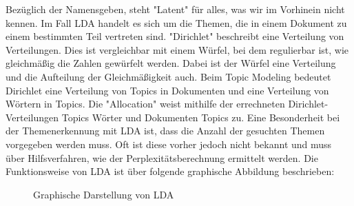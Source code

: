 \documentclass[german,version-2020-11]{uzl-thesis}
\begin{document}
Bezüglich der Namensgeben, steht "Latent" für alles, was wir im Vorhinein nicht kennen. Im Fall LDA handelt es sich um die Themen, die in einem Dokument zu einem bestimmten Teil vertreten sind. "Dirichlet" beschreibt eine Verteilung von Verteilungen. Dies ist vergleichbar mit einem Würfel, bei dem regulierbar ist, wie gleichmäßig die Zahlen gewürfelt werden. Dabei ist der Würfel eine Verteilung und die Aufteilung der Gleichmäßigkeit auch. Beim Topic Modeling bedeutet Dirichlet eine Verteilung von Topics in Dokumenten und eine Verteilung von Wörtern in Topics. Die "Allocation" weist  mithilfe der errechneten Dirichlet-Verteilungen Topics Wörter und Dokumenten Topics zu. Eine Besonderheit bei der Themenerkennung mit LDA ist, dass die Anzahl der gesuchten Themen  vorgegeben werden muss. Oft ist diese vorher jedoch nicht bekannt und muss über Hilfsverfahren, wie der Perplexitätsberechnung ermittelt werden. Die Funktionsweise von LDA ist über folgende graphische Abbildung beschrieben: \\

\begin{figure}[h]
\centering
{}
\caption{Graphische Darstellung von LDA}
\end{figure}
\end{document}
